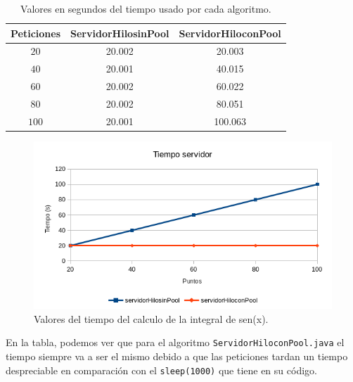 \documentclass[12pt,letterpaper]{article}
\begin{document}
\begin{center}
	\begin{table}[htbp]
		\begin{center}
			\begin{tabular}{|c|c|c|}
				\hline
				\textbf{Peticiones} & \textbf{ServidorHilosinPool} & \textbf{ServidorHiloconPool}  \\
				\hline
				$20$ & 20.002 & 20.003  \\ \hline
				$40$ & 20.001 & 40.015  \\ \hline
				$60$ & 20.002 & 60.022  \\ \hline
				$80$ & 20.002 & 80.051  \\ \hline
				$100$ & 20.001 & 100.063  \\ \hline
			\end{tabular}
			\caption{Valores en segundos del tiempo usado por cada algoritmo.}
			\label{tabla:Valores en segundos del tiempo usado por cada algoritmo}
		\end{center}
	\end{table}
\end{center}
\begin{figure}[h]
	\begin{center}
		\includegraphics[scale=1]{TiempoServidor.png}
		\caption{Valores del tiempo del calculo de la integral de sen(x).}
		\label{fig:Valores del tiempo del calculo de la integral de sen(x)}
	\end{center}
\end{figure}

En la tabla, podemos ver que para el algoritmo \texttt{ServidorHiloconPool.java} el tiempo siempre va a ser el mismo debido a que las peticiones tardan un tiempo despreciable en comparación con el \texttt{sleep(1000)} que tiene en su código.
\end{document}
